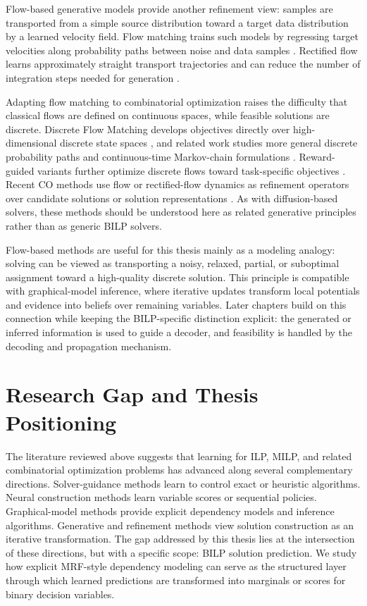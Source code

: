 Flow-based generative models provide another refinement view: samples are transported from a simple source distribution toward a target data distribution by a learned velocity field. Flow matching trains such models by regressing target velocities along probability paths between noise and data samples \cite{lipman_flow_2022,tong_improving_2023}. Rectified flow learns approximately straight transport trajectories and can reduce the number of integration steps needed for generation \cite{liu_flow_2022}.

Adapting flow matching to combinatorial optimization raises the difficulty that classical flows are defined on continuous spaces, while feasible solutions are discrete. Discrete Flow Matching develops objectives directly over high-dimensional discrete state spaces \cite{gat_discrete_2024}, and related work studies more general discrete probability paths and continuous-time Markov-chain formulations \cite{shaul_flow_2024}. Reward-guided variants further optimize discrete flows toward task-specific objectives \cite{su_discrete_2026}. Recent CO methods use flow or rectified-flow dynamics as refinement operators over candidate solutions or solution representations \cite{li_generation_2025,friedmann_transport_2026}. As with diffusion-based solvers, these methods should be understood here as related generative principles rather than as generic BILP solvers.

Flow-based methods are useful for this thesis mainly as a modeling analogy: solving can be viewed as transporting a noisy, relaxed, partial, or suboptimal assignment toward a high-quality discrete solution. This principle is compatible with graphical-model inference, where iterative updates transform local potentials and evidence into beliefs over remaining variables. Later chapters build on this connection while keeping the BILP-specific distinction explicit: the generated or inferred information is used to guide a decoder, and feasibility is handled by the decoding and propagation mechanism.

\section{Research Gap and Thesis Positioning}
\label{sec:rw_gap_positioning}

The literature reviewed above suggests that learning for ILP, MILP, and related combinatorial optimization problems has advanced along several complementary directions. Solver-guidance methods learn to control exact or heuristic algorithms. Neural construction methods learn variable scores or sequential policies. Graphical-model methods provide explicit dependency models and inference algorithms. Generative and refinement methods view solution construction as an iterative transformation. The gap addressed by this thesis lies at the intersection of these directions, but with a specific scope: BILP solution prediction. We study how explicit MRF-style dependency modeling can serve as the structured layer through which learned predictions are transformed into marginals or scores for binary decision variables.


